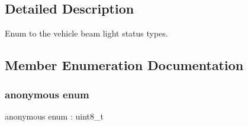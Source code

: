 \subsection{Detailed Description}
Enum to the vehicle beam light status types. 

\subsection{Member Enumeration Documentation}
\mbox{\label{structmaf__perception__interface_1_1VehicleBeamLightEnum_aa25c98329c832e8f4df5438a14e514f5}} 
\subsubsection{\texorpdfstring{anonymous enum}{anonymous enum}}
{\footnotesize\ttfamily anonymous enum \+: uint8\+\_\+t}

